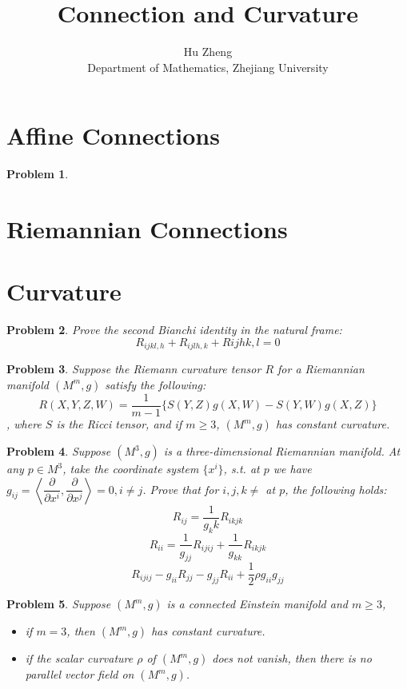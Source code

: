 \documentclass[11pt]{article}
\title{Connection and Curvature}
\author{Hu Zheng \\ Department of Mathematics, Zhejiang University}
\newcommand{\pd}{\partial}
\newtheorem{problem}{Problem}
\numberwithin{problem}{section}
\begin{document}
\maketitle
\tableofcontents

\section{Affine Connections}

\begin{problem}

\end{problem}

\section{Riemannian Connections}

\section{Curvature}

\begin{problem}
Prove the second Bianchi identity in the natural frame:
$$R_{ijkl,h}+R_{ijlh,k}+R{ijhk,l}=0$$
\end{problem}

\begin{problem}
Suppose the Riemann curvature tensor $R$ for a Riemannian manifold $(M^m,g)$ satisfy the following:
$$R(X,Y,Z,W)=\dfrac{1}{m-1}\{S(Y,Z)g(X,W)-S(Y,W)g(X,Z)\}$$,
where $S$ is the Ricci tensor, and if $m\ge 3$, $(M^m,g)$ has constant curvature.
\end{problem}

\begin{problem}
Suppose $(M^3,g)$ is a three-dimensional Riemannian manifold. At any $p\in M^3$, take the coordinate system $\{x^i\}$, s.t. at $p$ we have $g_{ij} = \left\langle \dfrac{\pd}{\pd x^i}, \dfrac{\pd}{\pd x^j} \right\rangle=0, i\neq j$. Prove that for $i, j, k\neq$ at $p$, the following holds:
$$R_{ij} = \dfrac{1}{g_kk}R_{ikjk}$$
$$R_{ii}=\dfrac{1}{g_{jj}}R_{ijij}+\dfrac{1}{g_{kk}}R_{ikjk}$$
$$R_{ijij}-g_{ii}R_{jj}-g_{jj}R_{ii}+\dfrac{1}{2}\rho g_{ii} g_{jj}$$
\end{problem}

\begin{problem}
Suppose $(M^m,g)$ is a connected Einstein manifold and $m\ge 3$,

\begin{itemize}
\item[(i)] if $m=3$, then $(M^m,g)$ has constant curvature.

\item[(ii)] if the scalar curvature $\rho$ of $(M^m, g)$ does not vanish, then there is no parallel vector field on $(M^m, g)$.
\end{itemize}
\end{problem}
\end{document}
